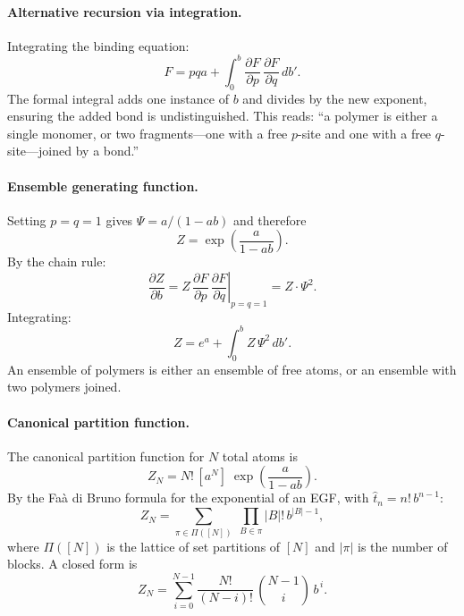 \documentclass[11pt]{amsart}
\newcommand{\GFspecies}{F}
\newcommand{\GFensemble}{Z}
\newcommand{\GFcomb}{\Psi}
\newcommand{\PDeriv}[2]{\frac{\partial #1}{\partial #2}}
\theoremstyle{definition}
\theoremstyle{plain}
\theoremstyle{remark}
\begin{document}
\paragraph{Alternative recursion via integration.}
Integrating the binding equation:
\begin{equation}\label{eq:linear_polymer_integral_recursion}
\GFspecies = pqa + \int_0^b \PDeriv{\GFspecies}{p}\,\PDeriv{\GFspecies}{q}\,db'.
\end{equation}
The formal integral adds one instance of $b$ and divides by the new exponent, ensuring the added bond is undistinguished.
This reads: ``a polymer is either a single monomer, or two fragments---one with a free $p$-site and one with a free $q$-site---joined by a bond.''

\paragraph{Ensemble generating function.}
Setting $p=q=1$ gives $\GFcomb = a/(1-ab)$ and therefore
\[
\GFensemble = \exp\!\left(\frac{a}{1-ab}\right).
\]
By the chain rule:
\begin{equation}\label{eq:linear_ensemble_binding}
\PDeriv{\GFensemble}{b}
= \GFensemble\,\left.\PDeriv{\GFspecies}{p}\,\PDeriv{\GFspecies}{q}\right|_{p=q=1}
= \GFensemble\cdot\GFcomb^2.
\end{equation}
Integrating:
\begin{equation}\label{eq:linear_ensemble_recursion}
\GFensemble = e^{a} + \int_0^b \GFensemble\,\GFcomb^2\,db'.
\end{equation}
An ensemble of polymers is either an ensemble of free atoms, or an ensemble with two polymers joined.

\paragraph{Canonical partition function.}
The canonical partition function for $N$ total atoms is
\begin{equation}\label{eq:linear_canonical_partition}
\GFensemble_N = N!\,[a^N]\;\exp\!\left(\frac{a}{1-ab}\right).
\end{equation}
By the Fa\`a di Bruno formula for the exponential of an EGF, with $\hat t_n = n!\,b^{n-1}$:
\begin{equation}\label{eq:linear_faa_di_bruno}
\GFensemble_N
= \sum_{\pi\in\Pi([N])}\;\prod_{B\in\pi} |B|!\,b^{|B|-1},
\end{equation}
where $\Pi([N])$ is the lattice of set partitions of $[N]$ and $|\pi|$ is the number of blocks.
A closed form is
\begin{equation}\label{eq:linear_explicit}
\GFensemble_N
= \sum_{i=0}^{N-1} \frac{N!}{(N-i)!}\,\binom{N-1}{i}\,b^{\,i}.
\end{equation}
\end{document}
